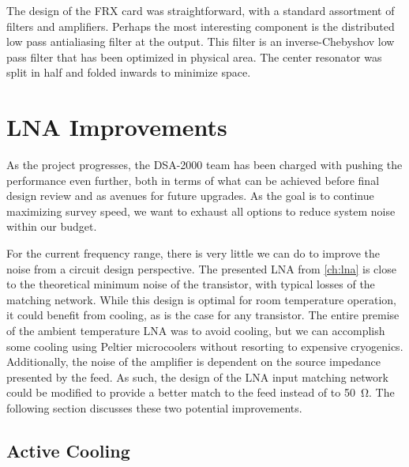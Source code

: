 The design of the FRX card was straightforward, with a standard assortment of filters and amplifiers.
Perhaps the most interesting component is the distributed low pass antialiasing filter at the output.
This filter is an inverse-Chebyshov low pass filter that has been optimized in physical area.
The center resonator was split in half and folded inwards to minimize space.

\section{LNA Improvements}

As the project progresses, the DSA-2000 team has been charged with pushing the performance even further, both in terms of what can be achieved before final design review and as avenues for future upgrades.
As the goal is to continue maximizing survey speed, we want to exhaust all options to reduce system noise within our budget.

For the current frequency range, there is very little we can do to improve the noise from a circuit design perspective.
The presented LNA from \autoref{ch:lna} is close to the theoretical minimum noise of the transistor, with typical losses of the matching network.
While this design is optimal for room temperature operation, it could benefit from cooling, as is the case for any transistor.
The entire premise of the ambient temperature LNA was to avoid cooling, but we can accomplish some cooling using Peltier microcoolers without resorting to expensive cryogenics.
Additionally, the noise of the amplifier is dependent on the source impedance presented by the feed.
As such, the design of the LNA input matching network could be modified to provide a better match to the feed instead of to \qty{50}{\ohm}.
The following section discusses these two potential improvements.

\subsection{Active Cooling}

